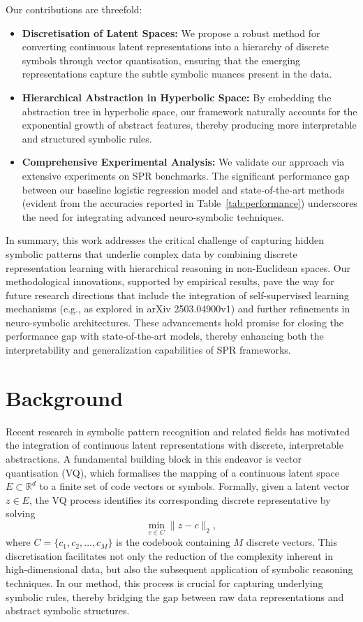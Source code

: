 \documentclass{article}
\begin{document}
\medskip

\noindent Our contributions are threefold:
\begin{itemize}
    \item \textbf{Discretisation of Latent Spaces:} We propose a robust method for converting continuous latent representations into a hierarchy of discrete symbols through vector quantisation, ensuring that the emerging representations capture the subtle symbolic nuances present in the data.
    \item \textbf{Hierarchical Abstraction in Hyperbolic Space:} By embedding the abstraction tree in hyperbolic space, our framework naturally accounts for the exponential growth of abstract features, thereby producing more interpretable and structured symbolic rules.
    \item \textbf{Comprehensive Experimental Analysis:} We validate our approach via extensive experiments on SPR benchmarks. The significant performance gap between our baseline logistic regression model and state-of-the-art methods (evident from the accuracies reported in Table~\ref{tab:performance}) underscores the need for integrating advanced neuro-symbolic techniques.
\end{itemize}

\medskip

\noindent In summary, this work addresses the critical challenge of capturing hidden symbolic patterns that underlie complex data by combining discrete representation learning with hierarchical reasoning in non-Euclidean spaces. Our methodological innovations, supported by empirical results, pave the way for future research directions that include the integration of self-supervised learning mechanisms (e.g., as explored in arXiv 2503.04900v1) and further refinements in neuro-symbolic architectures. These advancements hold promise for closing the performance gap with state-of-the-art models, thereby enhancing both the interpretability and generalization capabilities of SPR frameworks.

\section{Background}
Recent research in symbolic pattern recognition and related fields has motivated the integration of continuous latent representations with discrete, interpretable abstractions. A fundamental building block in this endeavor is vector quantisation (VQ), which formalises the mapping of a continuous latent space \( E \subset \mathbb{R}^d \) to a finite set of code vectors or symbols. Formally, given a latent vector \( z \in E \), the VQ process identifies its corresponding discrete representative by solving
\[
\min_{c \in C} \|z - c\|_2,
\]
where \( C = \{c_1, c_2, \ldots, c_M\} \) is the codebook containing \( M \) discrete vectors. This discretisation facilitates not only the reduction of the complexity inherent in high-dimensional data, but also the subsequent application of symbolic reasoning techniques. In our method, this process is crucial for capturing underlying symbolic rules, thereby bridging the gap between raw data representations and abstract symbolic structures.
\end{document}
